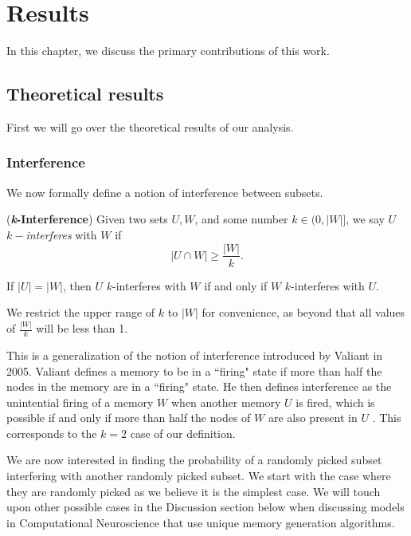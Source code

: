 \chapter{Results}

In this chapter, we discuss the primary contributions of this work. 

\section{Theoretical results}

First we will go over the theoretical results of our analysis. 

\subsection{Interference}

We now formally define a notion of interference between subsets. 

\begin{definition}
    (\textbf{\textit{k}-Interference}) Given two sets $U, W$, and some number $k \in (0,|W|]$, we say $U$ $k-$\textit{interferes} with $W$ if 
    \begin{equation}
        |U \cap W| \ge  \frac{|W|}{k}.
    \end{equation}
\end{definition}

\begin{corollary}
    \label{collorary:k-int-equals}
        If $|U| = |W|$, then $U$ $k$-interferes with $W$ if and only if $W$ $k$-interferes with $U$.
    \end{corollary}
    
We restrict the upper range of $k$ to $|W|$ for convenience, as beyond that all values of $\frac{|W|}{k}$ will be less than 1.

This is a generalization of the notion of interference introduced by Valiant in 2005. Valiant defines a memory to be in a ``firing" state if more than half the nodes in the memory are in a ``firing" state. He then defines interference as the unintential firing of a memory $W$ when another memory $U$ is fired, which is possible if and only if more than half the nodes of $W$ are also present in $U$ \cite{valiant2005memorization}. This corresponds to the $k = 2$ case of our definition. 

We are now interested in finding the probability of a randomly picked subset interfering with another randomly picked subset. We start with the case where they are randomly picked as we believe it is the simplest case. We will touch upon other possible cases in the Discussion section below when discussing models in Computational Neuroscience that use unique memory generation algorithms.


